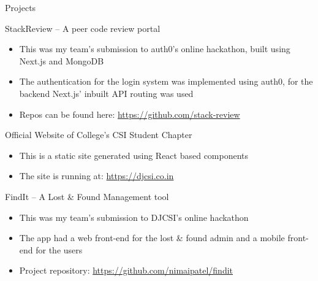 \documentclass{article}
\newlength{\tabin}
\newlength{\secsep}
\newcommand{\lineunder}{\vspace*{-8pt} \\ \hspace*{-6pt} \hrulefill \\ \vspace*{-15pt}}
\newenvironment{tabbedsection}[1]{
	\begin{list}{}{
		\setlength{\itemsep}{0pt}
		\setlength{\labelsep}{0pt}
		\setlength{\labelwidth}{0pt}
		\setlength{\leftmargin}{\tabin}
		\setlength{\rightmargin}{\tabin}
		\setlength{\listparindent}{0pt}
		\setlength{\parsep}{0pt}
		\setlength{\parskip}{0pt}
		\setlength{\partopsep}{0pt}
		\setlength{\topsep}{#1}
	}
	\item[]
}{\end{list}}
\newenvironment{resume_section}[1]{
	\filbreak
	\vspace{2\secsep}
	\textsc{\large#1}
	\lineunder
	\begin{tabbedsection}{\secsep}
}{\end{tabbedsection}}
\newenvironment{resume_subsection}[2][]{
	\textbf{#2} \hfill {\footnotesize #1} \hspace{2em}
	\begin{tabbedsection}{0.5\secsep}
}{\end{tabbedsection}}
\newenvironment{subitems}{
	\renewcommand{\labelitemi}{-}
	\begin{itemize}
		\setlength{\labelsep}{1em}
}{\end{itemize}}
\begin{document}
\begin{resume_section}{Projects}

	\begin{resume_subsection}{StackReview -- A peer code review portal}
		\begin{subitems}
			\item This was my team's submission to auth0's online hackathon, built using Next.js and MongoDB
			\item The authentication for the login system was implemented using auth0, for the backend Next.js' inbuilt API routing was used
			\item Repos can be found here: \href{https://github.com/stack-review}{https://github.com/stack-review}
		\end{subitems}
	\end{resume_subsection}

	\begin{resume_subsection}{Official Website of College's CSI Student Chapter}
		\begin{subitems}
			\item This is a static site generated using React based components
			\item The site is running at: \href{https://djcsi.co.in}{https://djcsi.co.in}
		\end{subitems}
	\end{resume_subsection}

	\begin{resume_subsection}{FindIt -- A Lost {\&} Found Management tool}
		\begin{subitems}
			\item This was my team's submission to DJCSI's online hackathon
			\item The app had a web front-end for the lost {\&} found admin and a mobile front-end for the users
			\item Project repository: \href{https://github.com/nimaipatel/findit}{https://github.com/nimaipatel/findit}
		\end{subitems}
	\end{resume_subsection}

\end{resume_section}
\end{document}
